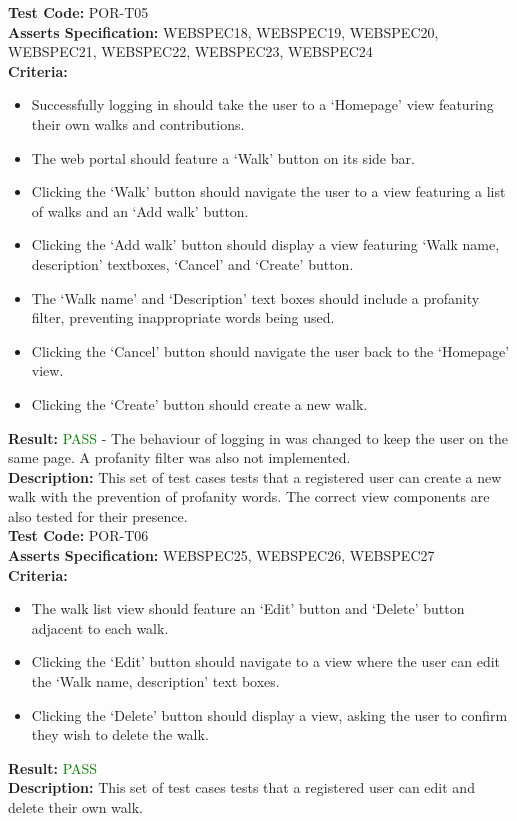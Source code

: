 \documentclass[11pt,a4paper]{report}
\begin{document}
\label{test:POR-T05}
\noindent\textbf{Test Code:} POR-T05\\
\textbf{Asserts Specification:} WEBSPEC18, WEBSPEC19, WEBSPEC20, WEBSPEC21, WEBSPEC22, WEBSPEC23, WEBSPEC24\\ 
\textbf{Criteria:} \begin{itemize}
                     \item Successfully logging in should take the user to a `Homepage' view featuring their own walks and contributions.
                     \item The web portal should feature a `Walk' button on its side bar.
                     \item Clicking the `Walk' button should navigate the user to a view featuring a list of walks and an `Add walk' button.
                     \item Clicking the `Add walk' button should display a view featuring `Walk name, description' textboxes, `Cancel' and `Create' button.
                     \item The `Walk name' and `Description' text boxes should include a profanity filter, preventing inappropriate words being used.
                     \item Clicking the `Cancel' button should navigate the user back to the `Homepage' view.
                     \item Clicking the `Create' button should create a new walk. 
                   \end{itemize}  
\textbf{Result:} \textcolor{green}{PASS} - The behaviour of logging in was changed to keep the user on the same page. A profanity filter was also not implemented.\\ 
\textbf{Description:} This set of test cases tests that a registered user can create a new walk with the prevention of profanity words. The correct view components are also tested for their presence. \\

\label{test:POR-T06}
\noindent\textbf{Test Code:} POR-T06\\
\textbf{Asserts Specification:} WEBSPEC25, WEBSPEC26, WEBSPEC27\\ 
\textbf{Criteria:} \begin{itemize}
                     \item The walk list view should feature an `Edit' button and `Delete' button adjacent to each walk.
                     \item Clicking the `Edit' button should navigate to a view where the user can edit the `Walk name, description' text boxes.
                     \item Clicking the `Delete' button should display a view, asking the user to confirm they wish to delete the walk.
                   \end{itemize}  
\textbf{Result:} \textcolor{green}{PASS}\\ 
\textbf{Description:} This set of test cases tests that a registered user can edit and delete their own walk. \\
\end{document}
